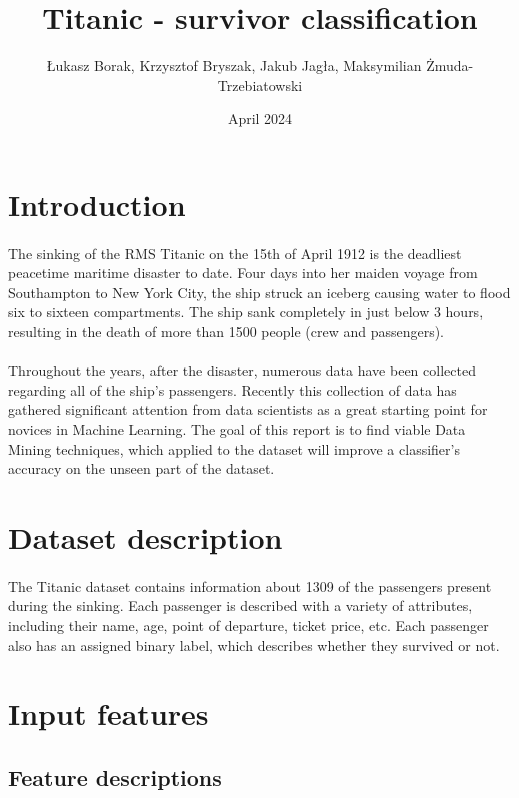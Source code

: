 \documentclass{article}
\title{\textbf{Titanic - survivor classification}}
\author{Łukasz Borak, Krzysztof Bryszak, Jakub Jagła, Maksymilian Żmuda-Trzebiatowski}
\date{April 2024}
\begin{document}
\maketitle

\section{Introduction}
\paragraph{} The sinking of the RMS Titanic on the 15th of April 1912 is the deadliest peacetime maritime disaster to date. Four days into her maiden voyage from Southampton to New York City, the ship struck an iceberg causing water to flood six to sixteen compartments. The ship sank completely in just below 3 hours, resulting in the death of more than 1500 people (crew and passengers).
\paragraph{} Throughout the years, after the disaster, numerous data have been collected regarding all of the ship’s passengers. Recently this collection of data has gathered significant attention from data scientists as a great starting point for novices in Machine Learning. The goal of this report is to find viable Data Mining techniques, which applied to the dataset will improve a classifier’s accuracy on the unseen part of the dataset.

\section{Dataset description}
\paragraph{}The Titanic dataset contains information about 1309 of the passengers present during the sinking. Each passenger is described with a variety of attributes, including their name, age, point of departure, ticket price, etc. Each passenger also has an assigned binary label, which describes whether they survived or not.

\newpage

\section{Input features}
\subsection{Feature descriptions}
\end{document}
